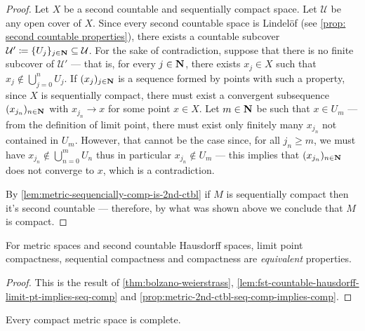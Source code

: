 \begin{proof}
Let \(X\) be a second countable and sequentially compact space. Let
\(\mathcal{U}\) be any open cover of \(X\). Since every second countable space
is Lindel\"{o}f (see \cref{prop: second countable properties}), there exists a
countable subcover
\(\mathcal{U}' \coloneq \{U_j\}_{j \in \mathbf{N}} \subseteq \mathcal{U}\). For the sake
of contradiction, suppose that there is no finite subcover of \(\mathcal{U}'\)
--- that is, for every \(j \in \mathbf{N}\), there exists \(x_j \in X\) such that
\(x_j \notin \bigcup_{j=0}^n U_j\). If \((x_j)_{j \in \mathbf{N}}\) is a sequence formed
by points with such a property, since \(X\) is sequentially compact, there must
exist a convergent subsequence \((x_{j_n})_{n \in \mathbf{N}}\) with \(x_{j_n} \to x\)
for some point \(x \in X\). Let \(m \in \mathbf{N}\) be such that \(x \in U_m\) --- from
the definition of limit point, there must exist only finitely many \(x_{j_n}\)
not contained in \(U_m\). However, that cannot be the case since, for all
\(j_n \geq m\), we must have \(x_{j_n} \notin \bigcup_{n=0}^m U_{n}\) thus in
particular \(x_{j_n} \notin U_m\) --- this implies that \((x_{j_n})_{n \in \mathbf{N}}\)
does not converge to \(x\), which is a contradiction.

By \cref{lem:metric-sequencially-comp-is-2nd-ctbl} if \(M\) is sequentially
compact then it's second countable --- therefore, by what was shown above we
conclude that \(M\) is compact.
\end{proof}

\begin{theorem}
\label{thm:metric-2d-ctbl-hausdorff-equiv-compactness}
For metric spaces and second countable Hausdorff spaces, limit point
compactness, sequential compactness and compactness are \emph{equivalent}
properties.
\end{theorem}

\begin{proof}
This is the result of \cref{thm:bolzano-weierstrass},
\cref{lem:fst-countable-hausdorff-limit-pt-implies-seq-comp} and
\cref{prop:metric-2nd-ctbl-seq-comp-implies-comp}.
\end{proof}

\begin{corollary}
\label{cor:compact-metric-space-is-complete}
Every compact metric space is complete.
\end{corollary}

